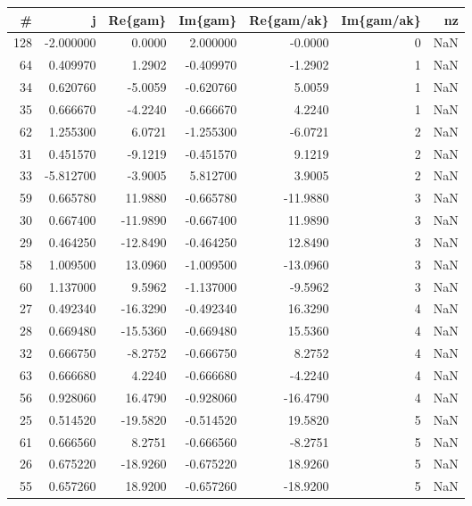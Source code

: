 \begin{tabular}{rrrrrrr}
\toprule
  \# &         j &  Re\{gam\} &   Im\{gam\} &  Re\{gam/ak\} &  Im\{gam/ak\} &  nz \\
\midrule
128 & -2.000000 &   0.0000 &  2.000000 &     -0.0000 &           0 & NaN \\
 64 &  0.409970 &   1.2902 & -0.409970 &     -1.2902 &           1 & NaN \\
 34 &  0.620760 &  -5.0059 & -0.620760 &      5.0059 &           1 & NaN \\
 35 &  0.666670 &  -4.2240 & -0.666670 &      4.2240 &           1 & NaN \\
 62 &  1.255300 &   6.0721 & -1.255300 &     -6.0721 &           2 & NaN \\
 31 &  0.451570 &  -9.1219 & -0.451570 &      9.1219 &           2 & NaN \\
 33 & -5.812700 &  -3.9005 &  5.812700 &      3.9005 &           2 & NaN \\
 59 &  0.665780 &  11.9880 & -0.665780 &    -11.9880 &           3 & NaN \\
 30 &  0.667400 & -11.9890 & -0.667400 &     11.9890 &           3 & NaN \\
 29 &  0.464250 & -12.8490 & -0.464250 &     12.8490 &           3 & NaN \\
 58 &  1.009500 &  13.0960 & -1.009500 &    -13.0960 &           3 & NaN \\
 60 &  1.137000 &   9.5962 & -1.137000 &     -9.5962 &           3 & NaN \\
 27 &  0.492340 & -16.3290 & -0.492340 &     16.3290 &           4 & NaN \\
 28 &  0.669480 & -15.5360 & -0.669480 &     15.5360 &           4 & NaN \\
 32 &  0.666750 &  -8.2752 & -0.666750 &      8.2752 &           4 & NaN \\
 63 &  0.666680 &   4.2240 & -0.666680 &     -4.2240 &           4 & NaN \\
 56 &  0.928060 &  16.4790 & -0.928060 &    -16.4790 &           4 & NaN \\
 25 &  0.514520 & -19.5820 & -0.514520 &     19.5820 &           5 & NaN \\
 61 &  0.666560 &   8.2751 & -0.666560 &     -8.2751 &           5 & NaN \\
 26 &  0.675220 & -18.9260 & -0.675220 &     18.9260 &           5 & NaN \\
 55 &  0.657260 &  18.9200 & -0.657260 &    -18.9200 &           5 & NaN \\

\end{tabular}
